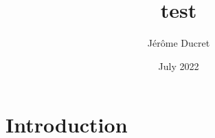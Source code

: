 \documentclass{article}
\title{test}
\author{Jérôme Ducret}
\date{July 2022}
\begin{document}
\maketitle

\section{Introduction}
\end{document}
